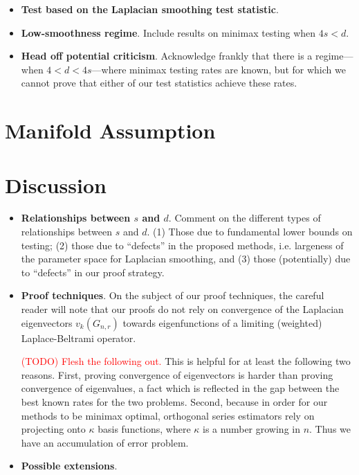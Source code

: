 \documentclass{article}
\newcommand{\1}{\mathbf{1}}
\theoremstyle{alden}
\theoremstyle{aldenthm}
\theoremstyle{definition}
\theoremstyle{remark}
\begin{document}
\begin{itemize}
	\item \textbf{Test based on the Laplacian smoothing test statistic}. 
	\item \textbf{Low-smoothness regime}. Include results on minimax testing when $4s < d$.
	\item \textbf{Head off potential criticism}. Acknowledge frankly that there is a regime---when $4 < d < 4s$---where minimax testing rates are known, but for which we cannot prove that either of our test statistics achieve these rates.
\end{itemize}

\section{Manifold Assumption}
\label{sec:manifold_assumption}


\section{Discussion}

\begin{itemize}
	\item \textbf{Relationships between $s$ and $d$}. Comment on the different types of relationships between $s$ and $d$. (1) Those due to fundamental lower bounds on testing; (2) those due to ``defects'' in the proposed methods, i.e. largeness of the parameter space for Laplacian smoothing, and (3) those (potentially) due to ``defects'' in our proof strategy.
	\item \textbf{Proof techniques}. On the subject of our proof techniques, the careful reader will note that our proofs do not rely on convergence of the Laplacian eigenvectors $v_k(G_{n,r})$ towards eigenfunctions of a limiting (weighted) Laplace-Beltrami operator.
	
	\textcolor{red}{(TODO) Flesh the following out.} This is helpful for at least the following two reasons. First, proving convergence of eigenvectors is harder than proving convergence of eigenvalues, a fact which is reflected in the gap between the best known rates for the two problems. Second, because in order for our methods to be minimax optimal, orthogonal series estimators rely on projecting onto $\kappa$ basis functions, where $\kappa$ is a number growing in $n$. Thus we have an accumulation of error problem.
	\item \textbf{Possible extensions}.
\end{itemize}
\end{document}
